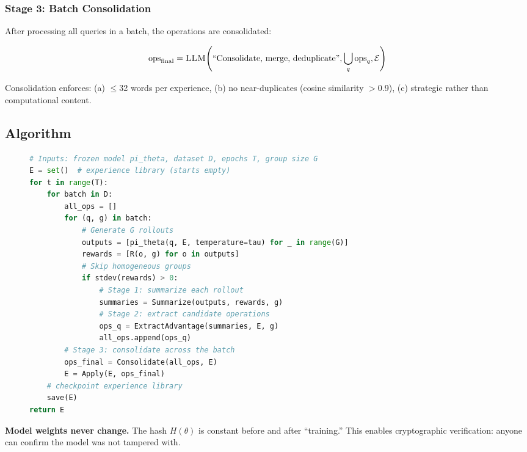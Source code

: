 \documentclass[11pt,letterpaper]{article}
\begin{document}
\subsubsection{Stage 3: Batch Consolidation}

After processing all queries in a batch, the operations are consolidated:

\begin{equation}
    \text{ops}_{\text{final}} = \textsc{LLM}\!\left(\text{``Consolidate, merge, deduplicate''}, \bigcup_q \text{ops}_q, \mathcal{E}\right)
\end{equation}

Consolidation enforces: (a) $\leq$32 words per experience, (b) no near-duplicates (cosine similarity $>$0.9), (c) strategic rather than computational content.

\subsection{Algorithm}

\begin{figure}[t]
\begin{lstlisting}[language=Python,basicstyle=\ttfamily\small,caption={Continuous GRPO (training-free)},label={alg:continuous-grpo},frame=single]
# Inputs: frozen model pi_theta, dataset D, epochs T, group size G
E = set()  # experience library (starts empty)
for t in range(T):
    for batch in D:
        all_ops = []
        for (q, g) in batch:
            # Generate G rollouts
            outputs = [pi_theta(q, E, temperature=tau) for _ in range(G)]
            rewards = [R(o, g) for o in outputs]
            # Skip homogeneous groups
            if stdev(rewards) > 0:
                # Stage 1: summarize each rollout
                summaries = Summarize(outputs, rewards, g)
                # Stage 2: extract candidate operations
                ops_q = ExtractAdvantage(summaries, E, g)
                all_ops.append(ops_q)
        # Stage 3: consolidate across the batch
        ops_final = Consolidate(all_ops, E)
        E = Apply(E, ops_final)
    # checkpoint experience library
    save(E)
return E
\end{lstlisting}
\end{figure}

\textbf{Model weights never change.}  The hash $H(\theta)$ is constant before and after ``training.''  This enables cryptographic verification: anyone can confirm the model was not tampered with.

\end{document}
